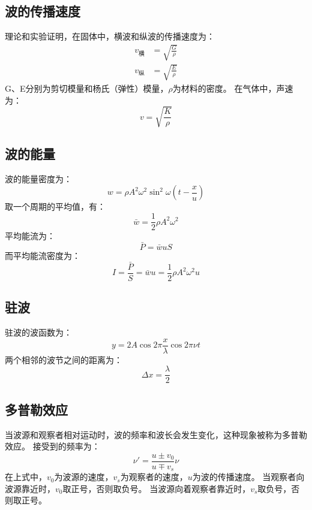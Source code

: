 \documentclass{ctexart}
\begin{document}
\subsection{波的传播速度}
理论和实验证明，在固体中，横波和纵波的传播速度为：
\begin{align*}
    v_{\text{横}} &= \sqrt{\frac{G}{\rho}} \\
    v_{\text{纵}} &= \sqrt{\frac{E}{\rho}}
\end{align*}
G、E分别为剪切模量和杨氏（弹性）模量，$\rho$为材料的密度。
在气体中，声速为：
$$
    v = \sqrt{\frac{K}{\rho}}
$$
\subsection{波的能量}
波的能量密度为：
$$
    w = \rho A^2 \omega^2 \sin^2 \omega\left(t - \frac{x}{u}\right)
$$
取一个周期的平均值，有：
$$
    \bar{w} = \frac{1}{2} \rho A^2 \omega^2
$$
平均能流为：
$$
    \bar{P} = \bar{w} u S
$$
而平均能流密度为：
$$
    I =\frac{\bar{P}}{S} = \bar{w}u = \frac{1}{2} \rho A^2 \omega^2 u
$$
\subsection{驻波}
驻波的波函数为：
$$
    y = 2A \cos 2\pi \frac{x}{\lambda} \cos 2\pi \nu t
$$
两个相邻的波节之间的距离为：
$$
    \Delta x = \frac{\lambda}{2}
$$
\subsection{多普勒效应}
当波源和观察者相对运动时，波的频率和波长会发生变化，这种现象被称为多普勒效应。
接受到的频率为：
$$
    \nu' = \frac{u \pm v_0}{u \mp v_s} \nu
$$
在上式中，$v_0$为波源的速度，$v_s$为观察者的速度，$u$为波的传播速度。
当观察者向波源靠近时，$v_0$取正号，否则取负号。
当波源向着观察者靠近时，$v_s$取负号，否则取正号。
\end{document}
